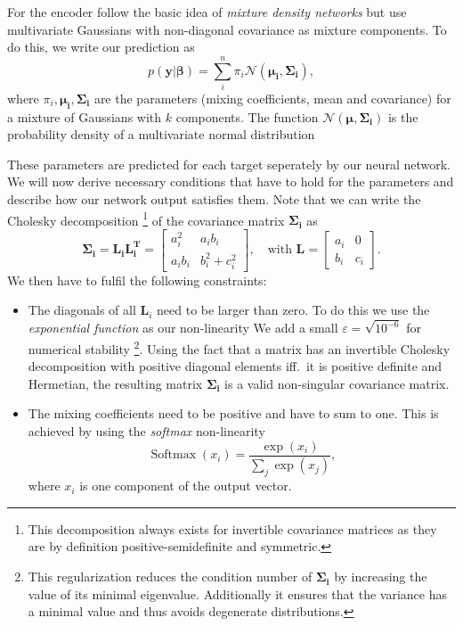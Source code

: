 \documentclass[nobib]{tufte-handout}
\begin{document}
For the encoder follow the basic idea of \textit{mixture density networks} but use multivariate Gaussians with non-diagonal covariance as mixture components\autocite{mdn}.
To do this, we write our prediction as
\begin{equation*}
p \left( \bm{y} | \bm{\beta} \right) = \sum_{i}^n \pi_i \mathcal{N} \left( \bm{\mu_i}, \bm{\Sigma_i} \right),
\end{equation*}
where \(\pi_i, \bm{\mu_i}, \bm{\Sigma_i}\) are the parameters (mixing coefficients, mean and covariance) for a mixture of Gaussians with \(k\) components.
The function \(\mathcal{N}(\bm{\mu}, \bm{\Sigma_i})\) is the probability density of a multivariate normal distribution 

These parameters are predicted for each target seperately by our neural network.
We will now derive necessary conditions that have to hold for the parameters and describe how our network output satisfies them.
Note that we can write the Cholesky decomposition%
\footnote{This decomposition always exists for invertible covariance matrices as they are by definition positive-semidefinite and symmetric.}
of the covariance matrix \(\bm{\Sigma_i}\) as
\begin{equation*}
  \bm{\Sigma_i} = \bm{L_i} \bm{L_i^T} =
  \begin{bmatrix}
    a_i^2 & a_ib_i \\
    a_ib_i & b_i^2 + c_i^2
  \end{bmatrix} ,\quad
   \text{with } \bm{L} =
   \begin{bmatrix}
     a_i & 0 \\
     b_i & c_i
   \end{bmatrix}.
\end{equation*}
We then have to fulfil the following constraints:
\begin{itemize}
\item The diagonals of all \(\bm{L}_i\) need to be larger than zero.
  To do this we use the \textit{exponential function} as our non-linearity
  We add a small \(\varepsilon = \sqrt{10^{-6}}\) for numerical stability%
  \footnote{This regularization reduces the condition number of \(\bm{\Sigma_i}\) by increasing the value of its minimal eigenvalue.
  Additionally it ensures that the variance has a minimal value and thus avoids degenerate distributions.}. %
  Using the fact that a matrix has an invertible Cholesky decomposition with positive diagonal elements iff.\ it is positive definite and Hermetian,
  the resulting matrix \(\bm{\Sigma_i}\) is a valid non-singular covariance matrix.
\item The mixing coefficients need to be positive and have to sum to one.
  This is achieved by using the \textit{softmax} non-linearity
  \begin{equation*}
    \operatorname{Softmax} (x_i) = \frac{\exp (x_i)}{\sum_j \exp (x_j)},
  \end{equation*}
  where \(x_i\) is one component of the output vector.
\end{itemize}
\end{document}
